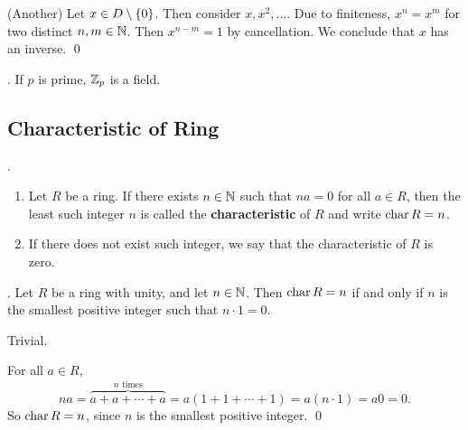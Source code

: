 \pagebreak

\pf (Another) Let \(x \in D \setminus \{0\}\). Then consider \(x, x^2, \dots\). Due to finiteness, \(x^n = x^m\) for two distinct \(n, m \in \mathbb{N}\). Then \(x^{n-m} = 1\) by cancellation. We conclude that \(x\) has an inverse. \qed

\cor. If \(p\) is prime, \(\mathbb{Z}_p\) is a field.

\subsection*{Characteristic of Ring}

. 
\begin{enumerate}
    \item Let \(R\) be a ring. If there exists \(n \in \mathbb{N}\) such that \(na = 0\) for all \(a \in R\), then the least such integer \(n\) is called the \textbf{characteristic} of \(R\) and write \(\operatorname{char} R = n\).
    \item If there does not exist such integer, we say that the characteristic of \(R\) is zero.
\end{enumerate}

\thm. Let \(R\) be a ring with unity, and let \(n \in \mathbb{N}\). Then \(\operatorname{char} R = n\) if and only if \(n\) is the smallest positive integer such that \(n \cdot 1 = 0\).

\pf \note{\mimp} Trivial.

\note{\mimpd} For all \(a \in R\),
\[
    na = \overbrace{a + a + \cdots + a}^{n \text{ times}} = a(1 + 1 + \cdots + 1) = a(n \cdot 1) = a0 = 0.
\]
So \(\operatorname{char} R = n\), since \(n\) is the smallest positive integer. \qed

\smallskip
